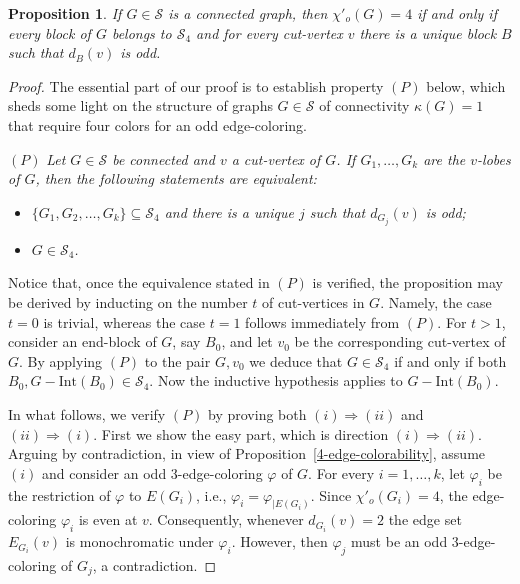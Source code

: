 \documentclass[a4paper,12pt]{article}
\newtheorem{proposition}[theorem]{Proposition}
\numberwithin{equation}{section}
\begin{document}
 \begin{proposition}
    \label{block tree}
 If $G\in\mathcal{S}$ is a connected graph, then  $\chi'_o(G)=4$ if and only if every block of $G$ belongs to $\mathcal{S}_4$ and for every cut-vertex $v$ there is a unique block $B$ such that $d_B(v)$ is odd.

\end{proposition}
\begin{proof}
The essential part of our proof is to establish property $(P)$ below, which sheds some light on the structure of graphs $G\in\mathcal{S}$ of connectivity $\kappa(G)=1$ that require four colors for an odd edge-coloring.

\medskip

\noindent $(P)$ \textit{Let $G\in\mathcal{S}$ be connected and $v$  a cut-vertex of $G$. If $G_1,\ldots,G_k$ are the $v$-lobes of $G$, then the following statements are equivalent:}
\begin{itemize}
\item[$(i)$]  \textit{$\{G_1,G_2,\ldots,G_k\}\subseteq\mathcal{S}_4$  and there is a unique $j$ such that $d_{G_j}(v)$ is odd;}
\item[$(ii)$] \textit{$G\in\mathcal{S}_4$.}
\end{itemize}


Notice that, once the equivalence stated in $(P)$ is verified, the proposition may be derived by inducting on the number $t$ of cut-vertices in $G$. Namely, the case $t=0$ is trivial, whereas the case $t=1$ follows immediately from $(P)$. For $t>1$, consider an end-block of $G$, say $B_0$, and let $v_0$ be the corresponding cut-vertex of $G$. By applying $(P)$ to the pair $G,v_0$ we deduce that $G\in\mathcal{S}_4$ if and only if both $B_0,G-\mathrm{Int}(B_0)\in\mathcal{S}_4$. Now the inductive hypothesis applies to $G-\mathrm{Int}(B_0)$.

\medskip

In what follows, we verify $(P)$ by proving both $(i)\Rightarrow(ii)$ and $(ii)\Rightarrow(i)$.
First we show the easy part, which is direction $(i)\Rightarrow(ii)$. Arguing by contradiction, in view of Proposition~\ref{4-edge-colorability}, assume $(i)$ and consider an odd $3$-edge-coloring $\varphi$ of $G$. For every $i=1,\ldots,k$, let $\varphi_i$ be the restriction of $\varphi$ to $E(G_i)$, i.e., $\varphi_i=\varphi_{|E(G_i)}$. Since $\chi'_o(G_i)=4$, the edge-coloring $\varphi_i$  is even at $v$. Consequently, whenever $d_{G_i}(v)=2$ the edge set $E_{G_i}(v)$ is monochromatic under $\varphi_i$. However, then $\varphi_j$ must be an odd $3$-edge-coloring of $G_j$, a contradiction.


\end{proof}
\end{document}
